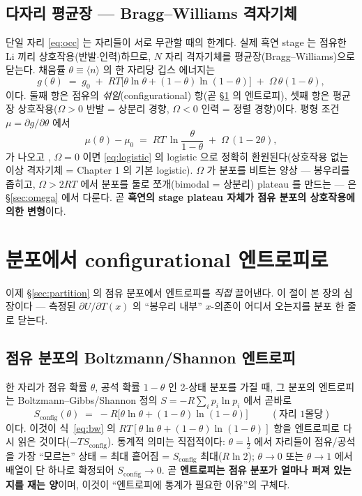 \documentclass[11pt,a4paper]{article}
\newcommand{\config}{\mathrm{config}}
\newcommand{\avg}[1]{\langle #1\rangle}
\begin{document}
\subsection{다자리 평균장 — Bragg--Williams 격자기체}
단일 자리 \eqref{eq:occ} 는 자리들이 서로 무관할 때의 한계다. 실제 흑연 stage 는 점유한 Li 끼리
상호작용(반발$\cdot$인력)하므로, $N$ 자리 격자기체를 평균장(Bragg--Williams)으로 닫는다. 채움률
$\theta\equiv\avg{n}$ 의 한 자리당 깁스 에너지는
\begin{equation}
g(\theta)\;=\;g_0 \;+\; RT\big[\theta\ln\theta+(1-\theta)\ln(1-\theta)\big]
          \;+\; \Omega\,\theta(1-\theta),
\label{eq:bw}
\end{equation}
이다. 둘째 항은 점유의 \emph{섞임}(configurational) 항(곧 \S\ref{sec:config} 의 엔트로피),
셋째 항은 평균장 상호작용($\Omega>0$ 반발 = 상분리 경향, $\Omega<0$ 인력 = 정렬 경향)이다.
평형 조건 $\mu=\partial g/\partial\theta$ 에서
\begin{equation}
\mu(\theta)-\mu_0
   \;=\; RT\,\ln\frac{\theta}{1-\theta} \;+\; \Omega\,(1-2\theta),
\label{eq:mu_bw}
\end{equation}
가 나오고 \cite{bazant2013}, $\Omega=0$ 이면 \eqref{eq:logistic} 의 logistic 으로 정확히 환원된다(상호작용 없는
이상 격자기체 = Chapter 1 의 기본 logistic). $\Omega$ 가 분포를 비트는 양상 — 봉우리를 좁히고,
$\Omega>2RT$ 에서 분포를 둘로 쪼개(bimodal = 상분리) plateau 를 만드는 — 은 \S\ref{sec:omega} 에서
다룬다. 곧 \textbf{흑연의 stage plateau 자체가 점유 분포의 상호작용에 의한 변형}이다.

\section{분포에서 configurational 엔트로피로}\label{sec:config}
이제 \S\ref{sec:partition} 의 점유 분포에서 엔트로피를 \emph{직접} 끌어낸다. 이 절이 본 장의 심장이다 —
측정된 $\partial U/\partial T(x)$ 의 ``봉우리 내부'' $x$-의존이 어디서 오는지를 분포 한 줄로 닫는다.

\subsection{점유 분포의 Boltzmann/Shannon 엔트로피}
한 자리가 점유 확률 $\theta$, 공석 확률 $1-\theta$ 인 2-상태 분포를 가질 때, 그 분포의 엔트로피는
Boltzmann--Gibbs/Shannon 정의 $S=-R\sum_i p_i\ln p_i$ 에서 곧바로
\begin{equation}
\boxed{\;S_\config(\theta)\;=\;-R\big[\theta\ln\theta+(1-\theta)\ln(1-\theta)\big]\;}
\qquad(\text{자리 1몰당})
\label{eq:Sconfig}
\end{equation}
이다. 이것이 식~\eqref{eq:bw} 의 $RT[\theta\ln\theta+(1-\theta)\ln(1-\theta)]$ 항을 엔트로피로
다시 읽은 것이다($-TS_\config$). 통계적 의미는 직접적이다: $\theta=\tfrac12$ 에서 자리들이 점유/공석을
가장 ``모르는'' 상태 = 최대 흩어짐 = $S_\config$ 최대($R\ln2$); $\theta\to0$ 또는 $\theta\to1$ 에서
배열이 단 하나로 확정되어 $S_\config\to0$. 곧 \textbf{엔트로피는 점유 분포가 얼마나 퍼져 있는지를
재는 양}이며, 이것이 ``엔트로피에 통계가 필요한 이유''의 구체다.
\end{document}
